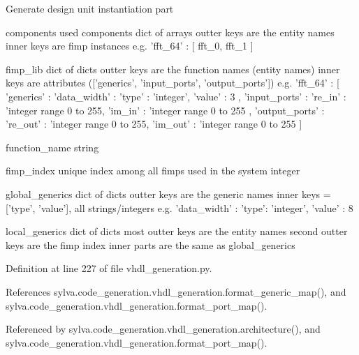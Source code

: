 \begin{DoxyVerb}Generate design unit instantiation part

  components
    used components
    dict of arrays
    outter keys are the entity names
    inner keys are fimp instances
    e.g. { 'fft_64' : [ fft_0, fft_1 ] }

  fimp_lib
    dict of dicts
    outter keys are the function names (entity names)
    inner keys are attributes (['generics', 'input_ports', 'output_ports'])
    e.g. { 'fft_64' :
           [ 'generics' :
             { 'data_width' :
               { 'type' : 'integer', 'value' : 3 }
             },
             'input_ports' :
             { 're_in' : 'integer range 0 to 255,
               'im_in' : 'integer range 0 to 255
             },
             'output_ports' :
             { 're_out' : 'integer range 0 to 255,
               'im_out' : 'integer range 0 to 255
             }
           ]
         }

  function_name
    string

  fimp_index
    unique index among all fimps used in the system
    integer

  global_generics
    dict of dicts
    outter keys are the generic names
    inner keys = ['type', 'value'], all strings/integers
    e.g. { 'data_width' : { 'type': 'integer', 'value' : 8 } }

  local_generics
    dict of dicts
    most outter keys are the entity names
    second outter keys are the fimp index
    inner parts are the same as global_generics
\end{DoxyVerb}
 

Definition at line 227 of file vhdl\+\_\+generation.\+py.



References sylva.\+code\+\_\+generation.\+vhdl\+\_\+generation.\+format\+\_\+generic\+\_\+map(), and sylva.\+code\+\_\+generation.\+vhdl\+\_\+generation.\+format\+\_\+port\+\_\+map().



Referenced by sylva.\+code\+\_\+generation.\+vhdl\+\_\+generation.\+architecture(), and sylva.\+code\+\_\+generation.\+vhdl\+\_\+generation.\+format\+\_\+port\+\_\+map().


